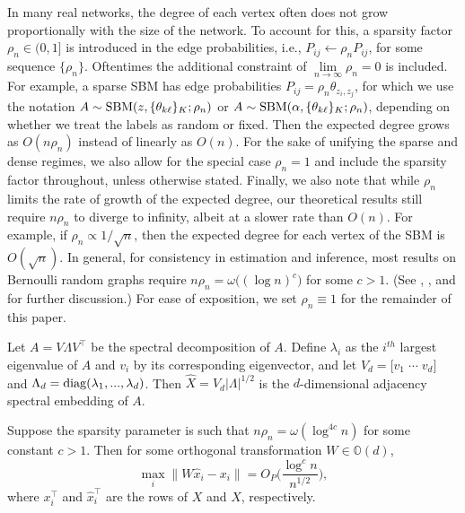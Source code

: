 \documentclass[12pt]{article}
\begin{document}
\begin{remark}
In many real networks, the degree of each vertex often does not grow proportionally with the size of the network. 
To account for this, a sparsity factor $\rho_n \in (0, 1]$ is introduced in the edge probabilities, i.e., $P_{ij} \leftarrow \rho_n P_{ij}$, for some sequence $\{\rho_n\}$. 
Oftentimes the additional constraint of $\lim\limits_{n \to \infty} \rho_n = 0$ is included. 
For example, a sparse SBM has edge probabilities $P_{ij} = \rho_n \theta_{z_i, z_j}$, for which we use the notation $A \sim \mathrm{SBM}(z, \{\theta_{k \ell}\}_K; \rho_n)$ or $A \sim \mathrm{SBM}(\alpha, \{\theta_{k \ell}\}_K; \rho_n)$, depending on whether we treat the labels as random or fixed. 
Then the expected degree grows as $O(n \rho_n)$ instead of linearly as $O(n)$. 
For the sake of unifying the sparse and dense regimes, we also allow for the special case $\rho_n = 1$ and include the sparsity factor throughout, unless otherwise stated. 
Finally, we also note that while $\rho_n$ limits the rate of growth of the expected degree, our theoretical results still require $n \rho_n$ to diverge to infinity, albeit at a slower rate than $O(n)$. 
For example, if $\rho_n \propto 1 / \sqrt{n}$, then the expected degree for each vertex of the SBM is $O(\sqrt{n})$. 
In general, for consistency in estimation and inference, most results on Bernoulli random graphs require $n \rho_n = \omega \big( (\log n)^c \big)$ for some $c > 1$. 
(See \citet{JMLR:v18:16-480}, \citet{https://doi.org/10.48550/arxiv.2106.09840}, and \citet{rubindelanchy2017statistical} for further discussion.)
For ease of exposition, we set $\rho_n \equiv 1$ for the remainder of this paper. 
\end{remark}

\begin{definition}
\label{def:ase}
Let $A = V \Lambda V^\top$ be the spectral decomposition of $A$. 
Define $\lambda_i$ as the $i^{th}$ largest eigenvalue of $A$ and $v_i$ by its corresponding eigenvector, and let $V_d = \bigl[ v_1 \; \cdots \; v_d \bigr]$ and $\Lambda_d = \mathrm{diag}(\lambda_1, ..., \lambda_d)$. 
Then $\hat{X} = V_d |\Lambda|^{1/2}$ is the $d$-dimensional adjacency spectral embedding of $A$. 
\end{definition}

\begin{theorem}
\label{theorem:ase-consistency}
Suppose the sparsity parameter is such that $n \rho_n = \omega (\log^{4 c} n)$ for some constant $c > 1$. 
Then for some orthogonal transformation $W \in \mathbb{O}(d)$, 
$$\max_i \|W \hat{x}_i - x_i \| = O_P \bigg( \frac{\log^c n}{n^{1/2}} \bigg),$$
where $x_i^\top$ and $\hat{x}_i^\top$ are the rows of $X$ and $\hat{X}$, respectively. 
\end{theorem}
\end{document}
